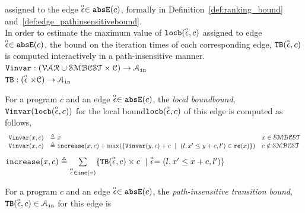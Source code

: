 \begin{enumerate}
assigned to the edge $\absevent \in \absE(c)$, formally in Definition~\ref{def:ranking_bound} and~\ref{def:edge_pathinsensitivebound}.
\\
In order to estimate the maximum value of $\locbound(\absevent, c)$ assigned to edge $\absevent \in \absE(c)$,
the bound on the iteration times of each corresponding edge, $\absclr(\absevent, c)$ 
is computed interactively in a path-insensitive manner.
\\ 
$ \varinvar: (\mathcal{VAR} \cup \constdom  \times \cdom) \to \mathcal{A}_{\lin}$
\\
$\absclr: (\absevent \times \cdom) \to \mathcal{A}_{\lin}$
\begin{defn}
  \label{def:ranking_bound}
For a program $c$ and an edge $\absevent \in \absE(c)$,
the \emph{local boundbound}, $\varinvar(\locbound(\absevent, c))$ for the local bound$\locbound(\absevent, c)$
of this edge
is computed as follows,
  \[ 
\begin{array}{lll}
  \varinvar(x, c) & \triangleq x & x \in \constdom \\
  \varinvar(x, c) & \triangleq \incrs(x, c) + \max(\{\varinvar(y, c) + c ~\mid~ (l, x' \leq y + c, l') \in \reset(x)\}) & c \notin \constdom
\end{array}
\]
%
$\incrs(x, c) \triangleq \sum\limits_{\absevent \in \inc(v)}\{\absclr(\absevent, c) \times c ~\mid~ \absevent = (l, x' \leq x + c, l')\}$
\end{defn}
%
\begin{defn}
  \label{def:edge_pathinsensitivebound}
  For a program $c$ and an edge $\absevent \in \absE(c)$, the \emph{path-insensitive transition bound},
  $\absclr(\absevent, c) \in \mathcal{A}_{\lin}$ 
for this edge is

\end{defn}
\end{enumerate}
